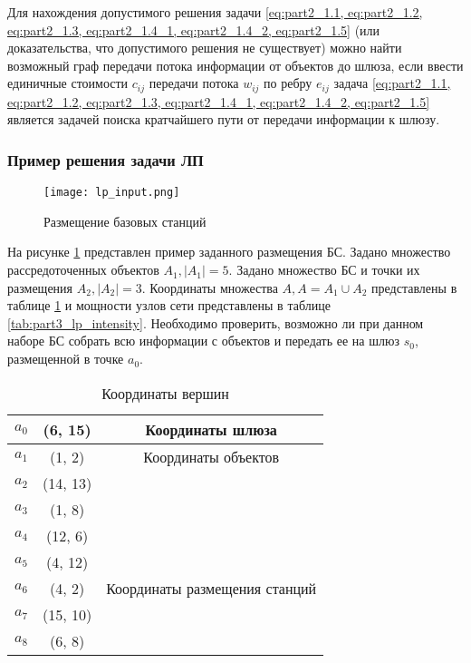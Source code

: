 Для нахождения допустимого решения задачи \cref{eq:part2_1.1, eq:part2_1.2, eq:part2_1.3, eq:part2_1.4_1, eq:part2_1.4_2,  eq:part2_1.5} (или доказательства, что допустимого решения не существует) можно найти возможный граф передачи потока информации от объектов до шлюза, если ввести единичные стоимости $c_{ij}$ передачи потока $w_{ij}$ по ребру $e_{ij}$ задача \cref{eq:part2_1.1, eq:part2_1.2, eq:part2_1.3, eq:part2_1.4_1, eq:part2_1.4_2,  eq:part2_1.5} является задачей поиска кратчайшего пути от передачи информации к шлюзу. 

\subsubsection{Пример решения задачи ЛП}


\begin{figure}[h!]
    \centering
     \texttt{[image: lp\_input.png]}
  \caption{Размещение базовых станций}
  \label{fig:part3_lp_input}
  \end{figure}

На рисунке \cref{fig:part3_lp_input} представлен пример заданного размещения БС. Задано множество рассредоточенных объектов $A_1, |A_1| = 5$. Задано множество БС и точки их размещения $A_2, |A_2| = 3$. Координаты множества $A, A = A_1 \cup A_2 $ представлены в таблице \cref{tab:part3_lp_input_coordinates} и мощности узлов сети представлены в таблице \cref{tab:part3_lp_intensity}. Необходимо проверить, возможно ли при данном наборе БС собрать всю информации с объектов  и передать ее на шлюз $s_0$, размещенной в точке $a_0$. 

\begin{table}[h!]\centering
    \begin{tabular}{| c| c|c |}\hline
        $a_0$& (6, 15)& Координаты шлюза \\
        \hline
        \hline
        $a_1$&(1, 2) & Координаты объектов \\
        $a_2$&(14, 13) &  \\
        $a_3$&(1, 8) & \\
        $a_4$&(12, 6) &  \\
        $a_5$&(4, 12) &  \\
        \hline
        \hline
        $a_6$&(4, 2) & Координаты размещения станций \\
        $a_7$&(15, 10) & \\
        $a_8$&(6, 8) & \\
        \hline
    \end{tabular}\caption{Координаты вершин}\label{tab:part3_lp_input_coordinates}
\end{table}

